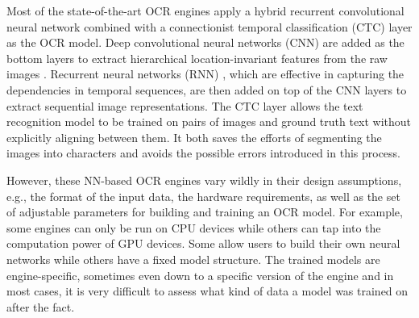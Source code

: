 \documentclass[conference]{IEEEtran}
\begin{document}
Most of the state-of-the-art OCR engines apply a hybrid recurrent convolutional
neural network combined with a connectionist temporal classification (CTC)
\cite{graves2006connectionist} layer as the OCR model. Deep convolutional
neural networks (CNN) \cite{krizhevsky2012imagenet} are added as the bottom
layers to extract hierarchical location-invariant features from the raw images
\cite{wick2018improving}. Recurrent neural networks (RNN)
\cite{mikolov2010recurrent}, which are effective in capturing the dependencies
in temporal sequences, are then added on top of the CNN layers to extract
sequential image representations. The CTC layer allows the text recognition
model to be trained on pairs of images and ground truth text without explicitly
aligning between them. It both saves the efforts of segmenting the images into
characters and avoids the possible errors introduced in this process.



However, these NN-based OCR engines vary wildly in their design
assumptions, e.g., the format of the input data, the hardware
requirements, as well as the set of adjustable parameters for
building and training an OCR model. For example, some engines can
only be run on CPU devices while others can tap into the
computation power of GPU devices. Some allow users to build their
own neural networks while others have a fixed model structure. The
trained models are engine-specific, sometimes even down to a specific
version of the engine and in most cases, it is very difficult to
assess what kind of data a model was trained on after the fact.
\end{document}
